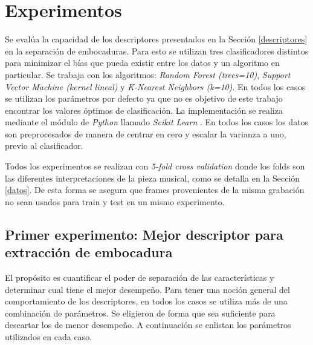 \documentclass{article}
\begin{document}
%
%
%
%


   
\section{Experimentos}

Se evalúa la capacidad de los descriptores presentados en la Sección \ref{descriptores} en la separación de embocaduras. Para esto se utilizan tres clasificadores distintos para minimizar el bías que pueda existir entre los datos y un algoritmo en particular. Se trabaja con los algoritmos: \textit{Random Forest (trees=10)}, \textit{Support Vector Machine (kernel lineal)} y \textit{K-Nearest Neighbors (k=10)}. En todos los casos se utilizan los parámetros por defecto ya que no es objetivo de este trabajo encontrar los valores óptimos de clasificación. La implementación se realiza mediante el módulo de \textit{Python} llamado \textit{Scikit Learn} \citep{pedregosa2011scikit}. En todos los casos los datos son preprocesados de manera de centrar en cero y escalar la varianza a uno, previo al clasificador.
\medskip

Todos los experimentos se realizan con \textit{5-fold cross validation} donde los folds son las diferentes interpretaciones de la pieza musical, como se detalla en la Sección \ref{datos}. De esta forma se asegura que frames provenientes de la misma grabación no sean usados para train y test en un mismo experimento.
\medskip

\subsection{Primer experimento: Mejor descriptor para extracción de embocadura}

El propósito es cuantificar el poder de separación de las características y determinar cual tiene el mejor desempeño. Para tener una noción general del comportamiento de los descriptores, en todos los casos se utiliza más de una combinación de parámetros. Se eligieron de forma que sea suficiente para descartar los de menor desempeño. A continuación se enlistan los parámetros utilizados en cada caso.
\end{document}
